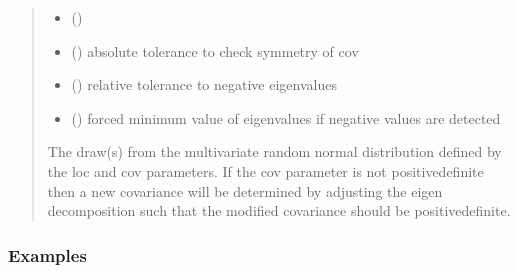 \documentclass[letterpaper,10pt,english]{sphinxmanual}
\begin{document}
\begin{fulllineitems}
\begin{quote}
\begin{description}
\begin{itemize}
\item {}
\sphinxAtStartPar
{} ()

\item {}
\sphinxAtStartPar
{} () \textendash{} absolute tolerance to check symmetry of cov

\item {}
\sphinxAtStartPar
{} () \textendash{} relative tolerance to negative eigenvalues

\item {}
\sphinxAtStartPar
{} () \textendash{} forced minimum value of eigenvalues if negative values are detected

\end{itemize}

\sphinxAtStartPar
{} \textendash{} The draw(s) from the multivariate random normal distribution defined
by the loc and cov parameters. If the cov parameter is not
positive\sphinxhyphen{}definite then a new covariance will be determined by adjusting
the eigen decomposition such that the modified covariance should be
positive\sphinxhyphen{}definite.

\sphinxAtStartPar
{}

\end{description}\end{quote}
\subsubsection*{Examples}


\end{fulllineitems}
\end{document}
